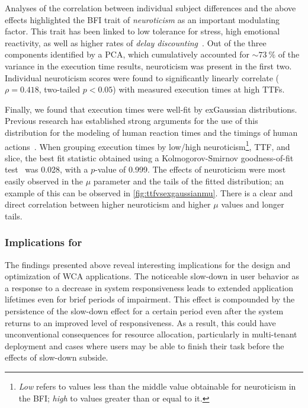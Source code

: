 Analyses of the correlation between individual subject differences and the above effects highlighted the \gls{BFI} trait of \emph{neuroticism} as an important modulating factor.
This trait has been linked to low tolerance for stress, high emotional reactivity, as well as higher rates of \emph{delay discounting}~\cite{hirsh2008delay}.
Out of the three components identified by a \gls{PCA}, which cumulatively accounted for \ensuremath{\sim\SI{73}{\percent}} of the variance in the execution time results, neuroticism was present in the first two.
Individual neuroticism scores were found to significantly linearly correlate (\ensuremath{\rho = 0.418}, two-tailed \ensuremath{p < 0.05}) with measured execution times at high \glspl{TTF}.

Finally, we found that execution times were well-fit by \gls{exGaussian} distributions.
Previous research has established strong arguments for the use of this distribution for the modeling of human reaction times and the timings of human actions~\cite{rohrer1994analysis,palmer2011what,marmolejo_ramos2022generalised}.
When grouping execution times by low/high neuroticism\footnote{%
    \emph{Low} refers to values less than the middle value obtainable for neuroticism in the \gls{BFI}; \emph{high} to values greater than or equal to it.
}, \gls{TTF}, and slice, the best fit statistic obtained using a Kolmogorov-Smirnov goodness-of-fit test~\cite{massey_jr1951kolmogorov} was \num{0.028}, with a \ensuremath{p}-value of \num{0.999}.
The effects of neuroticism were most easily observed in the \ensuremath{\mu} parameter and the tails of the fitted distribution;
an example of this can be observed in \cref{fig:ttfvsexgaussianmu}.
There is a clear and direct correlation between higher neuroticism and higher \ensuremath{\mu} values and longer tails.

\subsubsection{Implications for }

The findings presented above reveal interesting implications for the design and optimization of \gls{WCA} applications.
The noticeable slow-down in user behavior as a response to a decrease in system responsiveness leads to extended application lifetimes even for brief periods of impairment.
This effect is compounded by the persistence of the slow-down effect for a certain period even after the system returns to an improved level of responsiveness.
As a result, this could have unconventional consequences for resource allocation, particularly in multi-tenant deployment and cases where users may be able to finish their task before the effects of slow-down subside.

